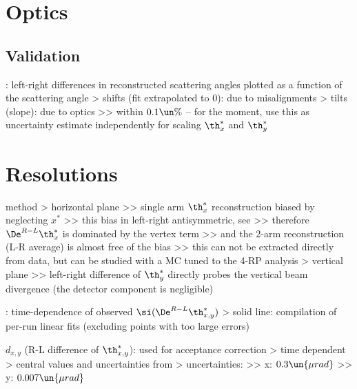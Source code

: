 \section{Optics}

\subsection{Validation}

\> : left-right differences in reconstructed scattering angles plotted as a function of the scattering angle
\>> shifts (fit extrapolated to 0): due to misalignments
\>> tilts (slope): due to optics
\>>> within $0.1\un{\%}$ -- for the moment, use this as uncertainty estimate independently for scaling $\th_x^*$ and $\th_y^*$



\section{Resolutions}

\> method
\>> horizontal plane
\>>> single arm $\th_x^*$ reconstruction biased by neglecting $x^*$
\>>> this bias in left-right antisymmetric, see 
\>>> therefore $\De^{R-L} \th_x^*$ is dominated by the vertex term
\>>> and the 2-arm reconstruction (L-R average) is almost free of the bias
\>>> this can not be extracted directly from data, but can be studied with a MC tuned to the 4-RP analysis
\>> vertical plane
\>>> left-right difference of $\th_y^*$ directly probes the vertical beam divergence (the detector component is negligible)

\>  : time-dependence of observed $\si(\De^{R-L} \th_{x, y}^*)$
\>> solid line: compilation of per-run linear fits (excluding points with too large errors)

\> $d_{x, y}$ (R-L difference of $\th_{x, y}^*$): used for acceptance correction
\>> time dependent
\>> central values and uncertainties from 
\>> uncertainties:
\>>> x: $0.3\un{\mu rad}$
\>>> y: $0.007\un{\mu rad}$

